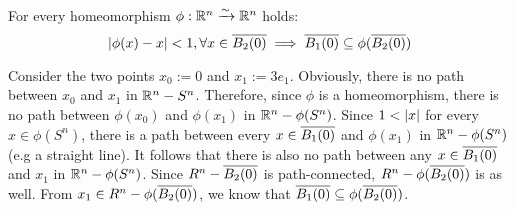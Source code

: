 \begin{mylemma}
    For every homeomorphism $\phi: \mathbb{R}^n \xrightarrow{\sim} \mathbb{R}^n$ holds:
    \[ \abs{\phi(x) - x} < 1, \forall x \in \clball[2] \implies \clball[1] \sub \phi(\clball[2]) \]
\end{mylemma}
\begin{myproof}
Consider the two points $x_0 := 0$ and $x_1 := 3e_1$.
Obviously, there is no path between $x_0$ and $x_1$ in $\mathbb{R}^n - S^n$.
Therefore, since $\phi$ is a homeomorphism, there is no path between $\phi(x_0)$ and $\phi(x_1)$ in $\mathbb{R}^n - \phi(S^n)$.
Since $1 < \vert{} x \vert{}$ for every $x \in\phi(S^n)$, there is a path between every $x \in \clball[1]$ and $\phi(x_1)$ in $\mathbb{R}^n - \phi(S^n)$ (e.g a straight line).
It follows that there is also no path between any $x \in \clball[1]$ and $x_1$ in $\mathbb{R}^n - \phi(S^n)$.
Since $R^n - \clball[2]$ is path-connected, $R^n - \phi(\clball[2])$ is as well. From $x_1 \in R^n - \phi(\clball[2])$, we know that $\clball[1] \sub \phi(\clball[2])$.
\end{myproof}

